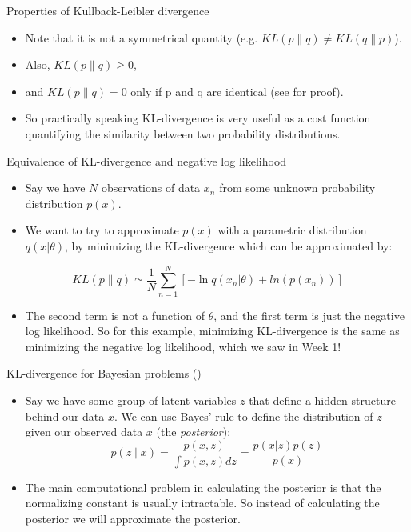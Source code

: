 \documentclass{beamer}
\begin{document}
\begin{frame}{Properties of Kullback-Leibler divergence}
  \begin{itemize}
  \item Note that it is not a symmetrical quantity (e.g. $KL(p\|q) \ne KL(q\|p)$).
  \item Also, $KL(p\|q) \ge 0$,
  \item and $KL(p\|q) = 0$ only if p and q are identical (see \cite{bishop} for proof).
  \item So practically speaking KL-divergence is very useful as a cost function quantifying the similarity between two probability distributions.
  \end{itemize}
\end{frame}

\begin{frame}{Equivalence of KL-divergence and negative log likelihood}
  \begin{itemize}
  \item Say we have $N$ observations of data $x_n$ from some unknown probability distribution $p(x)$.
  \item We want to try to approximate $p(x)$ with a parametric distribution $q(x|\theta)$, by minimizing the KL-divergence which can be approximated by:
  \end{itemize}
  \begin{equation}
    KL(p\|q) \simeq \frac{1}{N} \sum_{n=1}^{N} \left[ -\ln q(x_n | \theta) + ln(p (x_n))\right]
  \end{equation}
  \begin{itemize}
  \item The second term is not a function of $\theta$, and the first term is just the negative log likelihood. So for this example, minimizing KL-divergence is the same as minimizing the negative log likelihood, which we saw in Week 1!
  \end{itemize}
\end{frame}

\begin{frame}{KL-divergence for Bayesian problems (\cite{tran2016})}
  \begin{itemize}
  \item Say we have some group of latent variables $z$ that define a hidden structure behind our data $x$. We can use Bayes' rule to define the distribution of $z$ given our observed data $x$ (the \textit{posterior}):
    \[p(z \mid x) = \frac{p(x, z)}{\int p(x, z) dz} = \frac{p(x|z) p(z)}{p(x)}\]
  \item The main computational problem in calculating the posterior is that the normalizing constant is usually intractable. So instead of calculating the posterior we will approximate the posterior.
  \end{itemize}
\end{frame}
\end{document}

